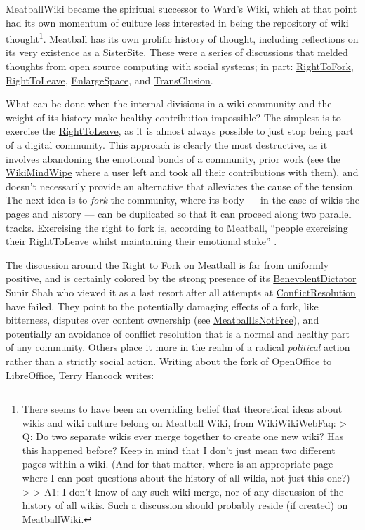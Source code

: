 MeatballWiki became the spiritual successor to Ward's Wiki, which at
that point had its own momentum of culture less interested in being the
repository of wiki thought\footnote{There seems to have been an
  overriding belief that theoretical ideas about wikis and wiki culture
  belong on Meatball Wiki, from
  \href{http://wiki.c2.com/?WikiWikiWebFaq}{WikiWikiWebFaq}:
  \textgreater{} Q: Do two separate wikis ever merge together to create
  one new wiki? Has this happened before? Keep in mind that I don't just
  mean two different pages within a wiki. (And for that matter, where is
  an appropriate page where I can post questions about the history of
  all wikis, not just this one?) \textgreater{} \textgreater{} A1: I
  don't know of any such wiki merge, nor of any discussion of the
  history of all wikis. Such a discussion should probably reside (if
  created) on MeatballWiki.}. Meatball has its own prolific history of
thought, including reflections on its very existence as a SisterSite.
These were a series of discussions that melded thoughts from open source
computing with social systems; in part:
\href{http://meatballwiki.org/wiki/RightToFork}{RightToFork},
\href{http://meatballwiki.org/wiki/RightToLeave}{RightToLeave},
\href{http://meatballwiki.org/wiki/EnlargeSpace}{EnlargeSpace}, and
\href{http://meatballwiki.org/wiki/TransClusion}{TransClusion}.

What can be done when the internal divisions in a wiki community and the
weight of its history make healthy contribution impossible? The simplest
is to exercise the
\href{http://meatballwiki.org/wiki/RightToLeave}{RightToLeave}, as it is
almost always possible to just stop being part of a digital community.
This approach is clearly the most destructive, as it involves abandoning
the emotional bonds of a community, prior work (see the
\href{http://wiki.c2.com/?WikiMindWipe}{WikiMindWipe} where a user left
and took all their contributions with them), and doesn't necessarily
provide an alternative that alleviates the cause of the tension. The
next idea is to \emph{fork} the community, where its body --- in the
case of wikis the pages and history --- can be duplicated so that it can
proceed along two parallel tracks. Exercising the right to fork is,
according to Meatball, ``people exercising their RightToLeave whilst
maintaining their emotional stake'' \citep{MeatballWikiRightToLeave} .

The discussion around the Right to Fork on Meatball is far from
uniformly positive, and is certainly colored by the strong presence of
its
\href{http://meatballwiki.org/wiki/BenevolentDictator}{BenevolentDictator}
Sunir Shah who viewed it as a last resort after all attempts at
\href{http://meatballwiki.org/wiki/ConflictResolution}{ConflictResolution}
have failed. They point to the potentially damaging effects of a fork,
like bitterness, disputes over content ownership (see
\href{http://meatballwiki.org/wiki/MeatballIsNotFree}{MeatballIsNotFree}),
and potentially an avoidance of conflict resolution that is a normal and
healthy part of any community. Others place it more in the realm of a
radical \emph{political} action rather than a strictly social action.
Writing about the fork of OpenOffice to LibreOffice, Terry Hancock
writes:

